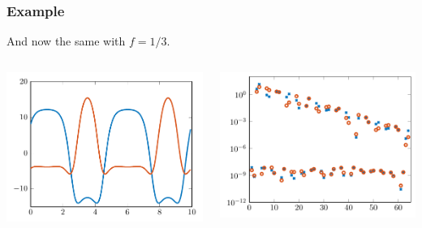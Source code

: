 \begin{frame}[t]
    \frametitle{Example}

    And now the same with $f = 1/3$.

    \vfill
    \begin{columns}
    \begin{column}{0.5\textwidth}
        \includegraphics[width=\textwidth]{figures/scft_example2_fields.pdf}
    \end{column}
    \begin{column}{0.5\textwidth}
        \includegraphics[width=\textwidth]{figures/scft_example2_fourier_coeffs.pdf}
    \end{column}
    \end{columns}
\end{frame}

